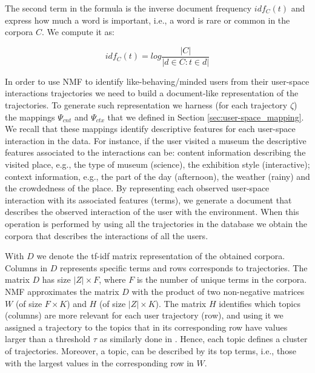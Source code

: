 The second term in the formula is the inverse document frequency $idf_C(t)$ and express how much a word is important, i.e., a word is rare or common in the corpora $C$. We compute it as:

$$idf_C(t)=log \frac{|C|}{|d\in C: t\in d|}$$ 


In order to use NMF to identify like-behaving/minded users from their user-space interactions trajectories we need to build a document-like representation of the trajectories. To generate such representation we harness (for each trajectory $\zeta$) the mappings $\Psi_{cnt}$ and $\Psi_{ctx}$ that we defined in Section \ref{sec:user-space_mapping}. We recall that these mappings identify descriptive features for each user-space interaction in the data. 
For instance, if the user visited a museum the descriptive features associated to the interactions can be: content information describing the visited place, e.g., the type of museum (science), the exhibition style (interactive); context information, e.g., the part of the day (afternoon), the weather (rainy) and the crowdedness of the place.
By representing each observed user-space interaction with its associated features (terms), we generate a document that describes the observed interaction of the user with the environment. When this operation is performed by using all the trajectories in the database we obtain the corpora that describes the interactions of all the users. 

With $D$ we denote the tf-idf matrix representation of the obtained corpora.
Columns in $D$ represents specific terms and rows corresponds to trajectories. 
The matrix $D$ has size $|Z| \times F$, where $F$ is the number of unique terms in the corpora. NMF approximates the matrix $D$ with the product of two non-negative matrices $W$ (of size $F \times K$) and $H$  (of size $|Z| \times K$).
The matrix $H$ identifies which topics (columns) are more relevant for each user trajectory (row), and using it we assigned a trajectory to the topics that in its corresponding row have values larger than a threshold $\tau$ as similarly done in \cite{nmf:multilabelannotation:2017}. Hence, each topic defines a cluster of trajectories.
Moreover, a topic, can be described by its top terms, i.e., those with the largest values in the corresponding row in $W$.

